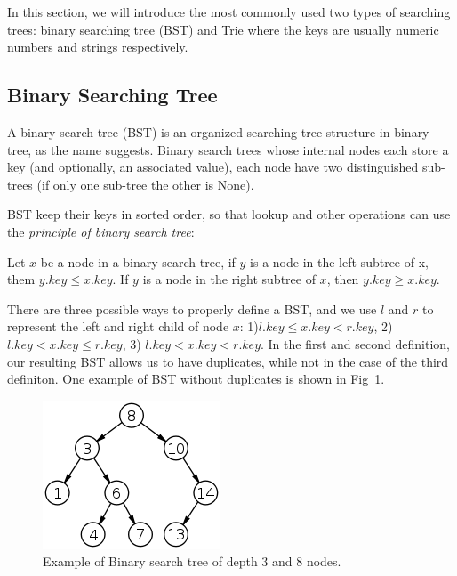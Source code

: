 \documentclass[data-structure.tex]{subfiles}
\begin{document}

In this section, we will introduce the most commonly used two types of searching trees: binary searching tree (BST) and Trie where the keys are usually numeric numbers and strings respectively. 

\subsection{Binary Searching Tree}
\label{concept_binary_search_tree}
A binary search tree (BST) is an organized searching tree structure in binary tree, as the name suggests. Binary search trees whose internal nodes each store a key (and optionally, an associated value), each node have two distinguished sub-trees (if only one sub-tree the other is None). 

BST keep their keys in sorted order, so that lookup and other operations can use the \textit{principle of binary search tree}: 

\indent Let $x$ be a node in a binary search tree, if $y$ is a node in the left subtree of x, them $y.key \leq x.key$. If $y$ is a node in the right subtree of $x$, then $y.key \geq x.key$. 

There are three possible ways to properly define a BST, and we use $l$ and $r$ to represent the left and right child of node $x$: 1)$l.key \leq x.key < r.key$, 2) $l.key  < x.key \leq r.key$, 3) $l.key < x.key < r.key$. In the first and second definition, our resulting BST allows us to have duplicates, while not in the case of the third definiton. One example of BST without duplicates is shown in Fig~\ref{fig:bst}. 
\begin{figure}[h]
    \centering
    \includegraphics[width = 0.6\columnwidth]{fig/Binary_search_tree.png}
    \caption{Example of Binary search tree of depth 3 and 8 nodes.}
    \label{fig:bst}
\end{figure}
\end{document}
